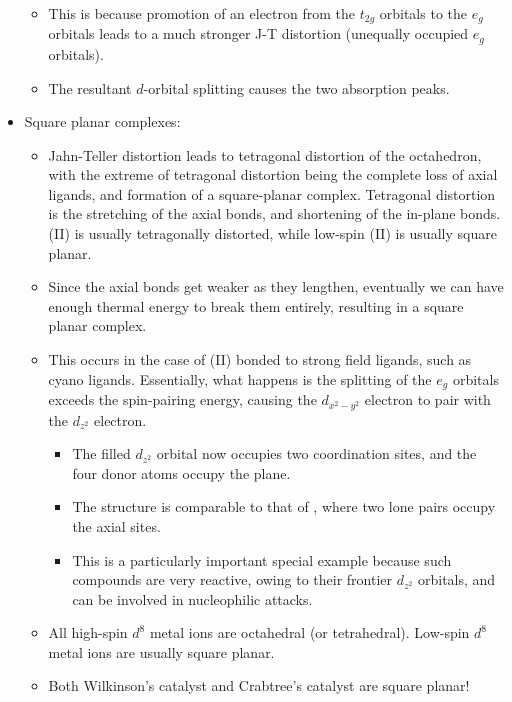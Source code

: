 \documentclass[../notes.tex]{subfiles}
\begin{document}
\begin{itemize}
\begin{itemize}
        \item This is because promotion of an electron from the $t_{2g}$ orbitals to the $e_g$ orbitals leads to a much stronger J-T distortion (unequally occupied $e_g$ orbitals).
        \item The resultant $d$-orbital splitting causes the two absorption peaks.
    \end{itemize}
    \item Square planar complexes:
    \begin{itemize}
        \item Jahn-Teller distortion leads to tetragonal distortion of the octahedron, with the extreme of tetragonal distortion being the complete loss of axial ligands, and formation of a square-planar complex. Tetragonal distortion is the stretching of the axial  bonds, and shortening of the in-plane bonds. (II) is usually tetragonally distorted, while low-spin (II) is usually square planar.
        \item Since the axial bonds get weaker as they lengthen, eventually we can have enough thermal energy to break them entirely, resulting in a square planar complex.
        \item This occurs in the case of (II) bonded to strong field ligands, such as cyano ligands. Essentially, what happens is the splitting of the $e_g$ orbitals exceeds the spin-pairing energy, causing the $d_{x^2-y^2}$ electron to pair with the $d_{z^2}$ electron.
        \begin{itemize}
            \item The filled $d_{z^2}$ orbital now occupies two coordination sites, and the four donor atoms occupy the plane.
            \item The structure is comparable to that of \ce{[IF4]-}, where two lone pairs occupy the axial sites.
            \item This is a particularly important special example because such compounds are very reactive, owing to their frontier $d_{z^2}$ orbitals, and can be involved in nucleophilic attacks.
        \end{itemize}
        \item All high-spin $d^8$ metal ions are octahedral (or tetrahedral). Low-spin $d^8$ metal ions are usually square planar.
        \item Both Wilkinson's catalyst and Crabtree's catalyst are square planar!
    \end{itemize}
\end{itemize}
\end{document}
